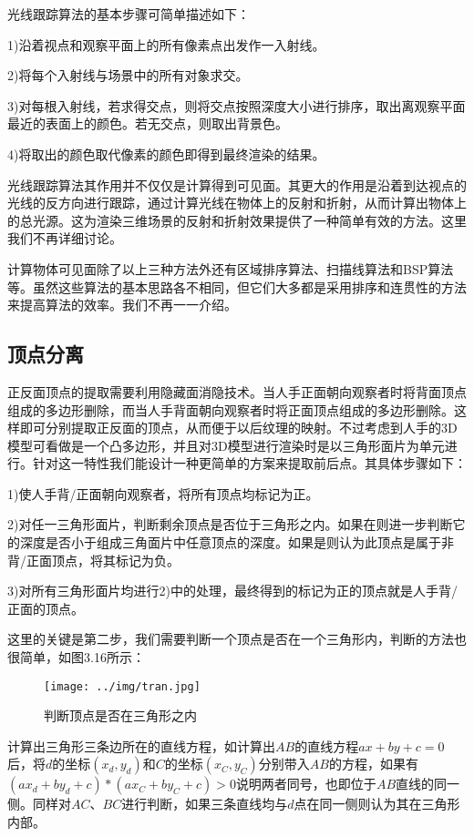 光线跟踪算法的基本步骤可简单描述如下\cite{ZhangYF07}：

1)沿着视点和观察平面上的所有像素点出发作一入射线。

2)将每个入射线与场景中的所有对象求交。

3)对每根入射线，若求得交点，则将交点按照深度大小进行排序，取出离观察平面最近的表面上的颜色。若无交点，则取出背景色。

4)将取出的颜色取代像素的颜色即得到最终渲染的结果。

光线跟踪算法其作用并不仅仅是计算得到可见面。其更大的作用是沿着到达视点的光线的反方向进行跟踪，通过计算光线在物体上的反射和折射，从而计算出物体上的总光源。这为渲染三维场景的反射和折射效果提供了一种简单有效的方法。这里我们不再详细讨论。

计算物体可见面除了以上三种方法外还有区域排序算法、扫描线算法和BSP算法等。虽然这些算法的基本思路各不相同，但它们大多都是采用排序和连贯性的方法来提高算法的效率。我们不再一一介绍。

\subsection{顶点分离}

正反面顶点的提取需要利用隐藏面消隐技术。当人手正面朝向观察者时将背面顶点组成的多边形删除，而当人手背面朝向观察者时将正面顶点组成的多边形删除。这样即可分别提取正反面的顶点，从而便于以后纹理的映射。不过考虑到人手的3D模型可看做是一个凸多边形，并且对3D模型进行渲染时是以三角形面片为单元进行\cite{Shreiner07}。针对这一特性我们能设计一种更简单的方案来提取前后点。其具体步骤如下：

1)使人手背/正面朝向观察者，将所有顶点均标记为正。

2)对任一三角形面片，判断剩余顶点是否位于三角形之内。如果在则进一步判断它的深度是否小于组成三角面片中任意顶点的深度。如果是则认为此顶点是属于非背/正面顶点，将其标记为负。

3)对所有三角形面片均进行2)中的处理，最终得到的标记为正的顶点就是人手背/正面的顶点。

这里的关键是第二步，我们需要判断一个顶点是否在一个三角形内，判断的方法也很简单，如图3.16所示：
\begin{figure}[htb]
\centering
\texttt{[image: ../img/tran.jpg]}
\caption{判断顶点是否在三角形之内}
\label{fig：graph}
\end{figure} 

计算出三角形三条边所在的直线方程，如计算出$AB$的直线方程$ax+by+c=0$后，将$d$的坐标$(x_{d},y_{d})$和$C$的坐标$(x_{C},y_{C})$分别带入$AB$的方程，如果有$(ax_{d}+by_{d}+c)*(ax_{C}+by_{C}+c)>0$说明两者同号，也即位于$AB$直线的同一侧。同样对$AC$、$BC$进行判断，如果三条直线均与$d$点在同一侧则认为其在三角形内部。

